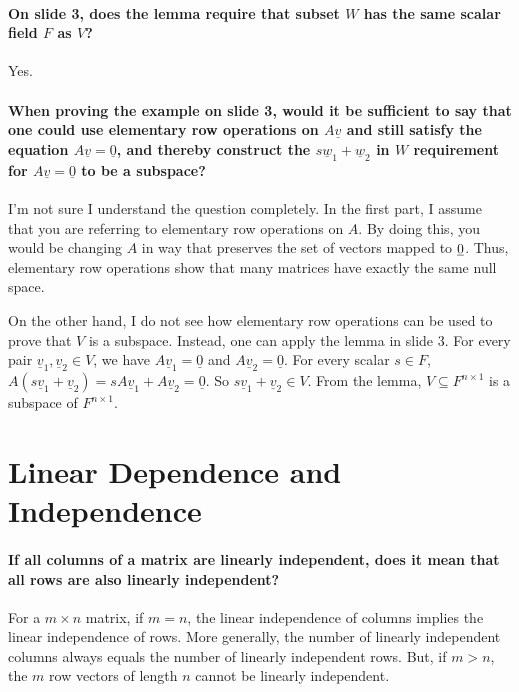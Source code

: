 \documentclass[10pt,english]{article}
\begin{document}
\paragraph{On slide 3, does the lemma require that subset $W$ has the same scalar field $F$ as $V$?}
Yes. %


\paragraph{When proving the example on slide 3, would it be sufficient to say that one could use elementary row operations on $A\underline{v}$ and still satisfy the equation $A\underline{v}=\underline{0}$, and thereby construct the $s\underline{w}_1 + \underline{w}_2$ in $W$ requirement for $A\underline{v}=\underline{0}$ to be a subspace?}
I'm not sure I understand the question completely.
In the first part, I assume that you are referring to elementary row operations on $A$.
By doing this, you would be changing $A$ in way that preserves the set of vectors mapped to $\underline{0}$.
Thus, elementary row operations  show that many matrices have exactly the same null space.

On the other hand, I do not see how elementary row operations can be used to prove that $V$ is a subspace.
Instead, one can apply the lemma in slide 3.
For every pair $\underline{v}_1, \underline{v}_2 \in V$, we have $A\underline{v}_1=\underline{0}$ and $A\underline{v}_2=\underline{0}$. For every scalar $s\in F$, $A(s\underline{v}_1+\underline{v}_2) = sA\underline{v}_1 + A\underline{v}_2 = \underline{0}$. So $s\underline{v}_1+\underline{v}_2 \in V$. From the lemma, $V\subseteq F^{n \times 1}$ is a subspace of $F^{n \times 1}$.

\section{Linear Dependence and Independence}

\paragraph{If all columns of a matrix are linearly independent, does it mean that all rows are also linearly independent?}
For a $m\times n$ matrix, if $m=n$, the linear independence of columns implies the linear independence of rows.
More generally, the number of linearly independent columns always equals the number of linearly independent rows.
But, if $m>n$, the $m$ row vectors of length $n$ cannot be linearly independent.
\end{document}
